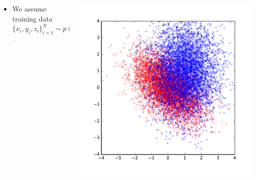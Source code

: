 \documentclass{beamer}
\begin{document}
\begin{frame}
\begin{columns}[t]
\begin{column}{0.8\textwidth}
\begin{itemize}
               \item We assume training data $\{ x_i, y_i, z_i \}_{i=1}^N \sim p(X,Y,Z)$.
            \end{itemize}
        \end{column}
        \begin{column}{0.3\textwidth}
            \begin{center}
                \includegraphics[width=\textwidth]{figures/toy-data.pdf}
            \end{center}
        \end{column}
    \end{columns}
\end{frame}
\end{document}
